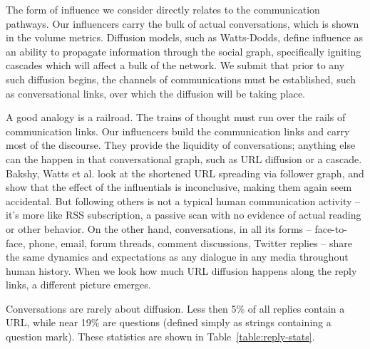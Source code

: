 \documentclass[10pt,oneside]{memoir}
\begin{document}
\begin{Spacing}{2}
The form of influence we consider directly relates to the communication pathways.  Our influencers carry the bulk of actual conversations, which is shown in the volume metrics.  Diffusion models, such as Watts-Dodds, define influence as an ability to propagate information through the social graph, specifically igniting cascades which will affect a bulk of the network.  We submit that prior to any such diffusion begins, the channels of communications must be established, such as conversational links, over which the diffusion will be taking place.


A good analogy is a railroad.  The trains of thought must run over the rails of communication links. Our influencers build the communication links and carry most of the discourse.  They provide the liquidity of conversations; anything else can the happen in that conversational graph, such as URL diffusion or a cascade.   Bakshy, Watts et al. \cite{bakshy2011everyone} look at the shortened URL spreading via follower graph, and show that the effect of the influentials is inconclusive, making them again seem accidental.  But following others is not a typical human communication activity -- it's more like RSS subscription, a passive scan with no evidence of actual reading or other behavior.  On the other hand, conversations, in all its forms -- face-to-face, phone, email, forum threads,  comment discussions, Twitter replies -- share the same dynamics and expectations as any dialogue in any media throughout human history.  When we look how much URL diffusion happens along the reply links, a different picture emerges.


Conversations are rarely about diffusion.  Less then 5\% of all replies contain a URL, while near 19\% are questions (defined simply as strings containing a question mark).  These statistics are shown in Table~\ref{table:reply-stats}.




\end{Spacing}
\end{document}
